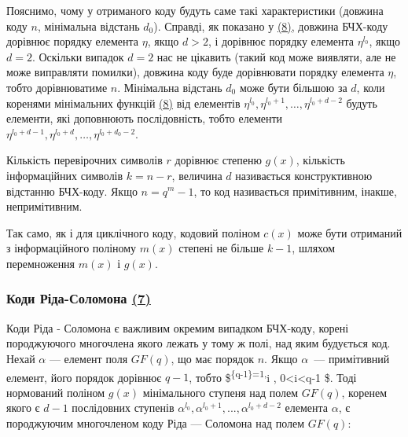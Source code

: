\documentclass[11pt]{article}
\begin{document}
Пояснимо, чому у отриманого коду будуть саме такі характеристики
(довжина коду \({\displaystyle n}\), мінімальна відстань
\({\displaystyle d_{0}}\)). Справді, як показано у
\hyperref[література]{(8)}, довжина БЧХ-коду дорівнює порядку елемента
\({\displaystyle \eta }\), якщо \({\displaystyle d>2}\), і дорівнює
порядку елемента \({\displaystyle \eta ^{l_{0}}}\), якщо
\({\displaystyle d=2}\). Оскільки випадок \({\displaystyle d=2}\) нас не
цікавить (такий код може виявляти, але не може виправляти помилки),
довжина коду буде дорівнювати порядку елемента
\({\displaystyle \eta }\), тобто дорівнюватиме \({\displaystyle n}\).
Мінімальна відстань \({\displaystyle d_{0}}\) може бути більшою за
\({\displaystyle d}\), коли коренями мінімальних функцій
\hyperref[література]{(8)} від елементів
\({\displaystyle \eta ^{l_{0}},\eta ^{l_{0}+1},\ldots ,\eta ^{l_{0}+d-2}}\)
будуть елементи, які доповнюють послідовність, тобто елементи
\({\displaystyle \eta ^{l_{0}+d-1},\eta ^{l_{0}+d},\ldots ,\eta ^{l_{0}+d_{0}-2}}\).

Кількість перевірочних символів \({\displaystyle r}\) дорівнює степеню
\({\displaystyle g(x)}\), кількість інформаційних символів
\({\displaystyle k=n-r}\), величина \({\displaystyle d}\) називається
конструктивною відстанню БЧХ-коду. Якщо \({\displaystyle n=q^{m}-1}\),
то код називається примітивним, інакше, непримітивним.

Так само, як і для циклічного коду, кодовий поліном
\({\displaystyle c(x)}\) може бути отриманий з інформаційного поліному
\({\displaystyle m(x)}\) степені не більше \({\displaystyle k-1}\),
шляхом перемноження \({\displaystyle m(x)}\) і \({\displaystyle g(x)}\).

    \hypertarget{ux43aux43eux434ux438-ux440ux456ux434ux430-ux441ux43eux43bux43eux43cux43eux43dux430-7}{%
\subsubsection{\texorpdfstring{Коди Ріда-Соломона
\hyperref[література]{(7)}}{Коди Ріда-Соломона }}\label{ux43aux43eux434ux438-ux440ux456ux434ux430-ux441ux43eux43bux43eux43cux43eux43dux430-7}}

Коди Ріда - Соломона є важливим окремим випадком БЧХ-коду, корені
породжуючого многочлена якого лежать у тому ж полі, над яким будується
код. Нехай \(\alpha\) --- елемент поля \(\textstyle GF(q)\), що має
порядок \(\textstyle n\). Якщо \(\alpha\)~--- примітивний елемент, його
порядок дорівнює \(q-1\), тобто
\$\alpha\textsuperscript{\{q-1\}=1,\quad \alpha}i ,
0\textless i\textless q-1 \$. Тоді нормований поліном \(g(x)\)
мінімального ступеня над полем \(\textstyle GF(q)\), коренем якого є
\(𝑑−1\) послідовних ступенів
\(\alpha^{l_0}, \alpha^{l_0+1},...,\alpha^{l_0+d-2}\) елемента
\(\alpha\), є породжуючим многочленом коду Ріда --- Соломона над полем
\(\textstyle GF(q)\):
\end{document}
